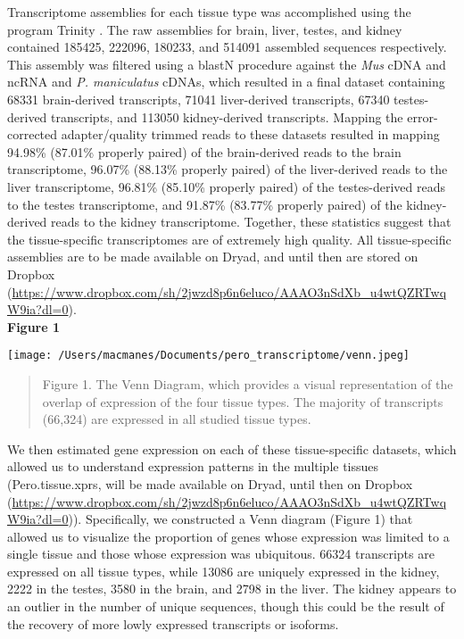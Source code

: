 \documentclass[11pt]{article}
\begin{document}
Transcriptome assemblies for each tissue type was accomplished using the program Trinity \cite{Haas:2013jq}. The raw assemblies for brain, liver, testes, and kidney contained 185425, 222096, 180233, and 514091 assembled sequences respectively. This assembly was filtered using a blastN procedure against the \textit{Mus} cDNA and ncRNA and \textit{P. maniculatus} cDNAs, which resulted in a final dataset containing 68331 brain-derived transcripts, 71041 liver-derived transcripts, 67340 testes-derived transcripts, and 113050 kidney-derived transcripts. Mapping the error-corrected adapter/quality trimmed reads to these datasets resulted in mapping 94.98\% (87.01\% properly paired) of the brain-derived reads to the brain transcriptome, 96.07\% (88.13\% properly paired) of the liver-derived reads to the liver transcriptome, 96.81\% (85.10\% properly paired) of the testes-derived reads to the testes transcriptome, and 91.87\% (83.77\% properly paired) of the kidney-derived reads to the kidney transcriptome. Together, these statistics suggest that the tissue-specific transcriptomes are of extremely high quality. All tissue-specific assemblies are to be made available on Dryad, and until then are stored on Dropbox (\url{https://www.dropbox.com/sh/2jwzd8p6n6eluco/AAAO3nSdXb_u4wtQZRTwqW9ia?dl=0}). \\

\textbf{\hypertarget{Figure 1}{Figure 1}} \\
\centerline{\texttt{[image: /Users/macmanes/Documents/pero\_transcriptome/venn.jpeg]}}
\begin{quote}
\small{Figure 1. The Venn Diagram, which provides a visual representation of the overlap of expression of the four tissue types. The majority of transcripts (66,324) are expressed in all studied tissue types.}
\end{quote}   

We then estimated gene expression on each of these tissue-specific datasets, which allowed us to understand expression patterns in the multiple tissues (Pero.tissue.xprs, will be made available on Dryad, until then on Dropbox (\url{https://www.dropbox.com/sh/2jwzd8p6n6eluco/AAAO3nSdXb_u4wtQZRTwqW9ia?dl=0})). Specifically, we constructed a Venn diagram ({\hypertarget{Figure 1}{Figure 1}}) that allowed us to visualize the proportion of genes whose expression was limited to a single tissue and those whose expression was ubiquitous. 66324 transcripts are expressed on all tissue types, while 13086 are uniquely expressed in the kidney, 2222 in the testes, 3580 in the brain, and 2798 in the liver. The kidney appears to an outlier in the number of unique sequences, though this could be the result of the recovery of more lowly expressed transcripts or isoforms.  \\
\end{document}
